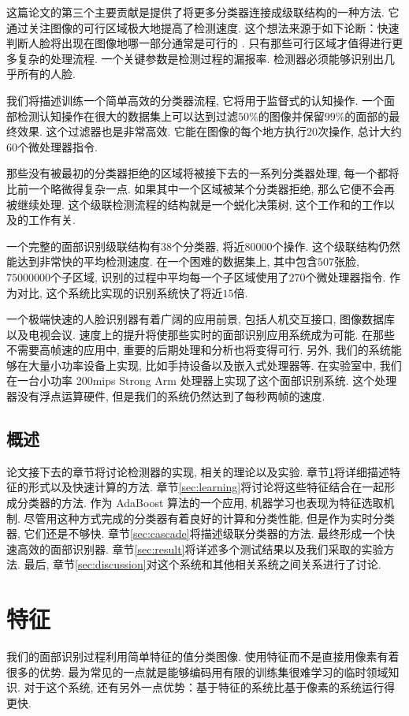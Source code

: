 \documentclass[a4paper,utf8,11pt, onecolumn]{ctexart}
\begin{document}
这篇论文的第三个主要贡献是提供了将更多分类器连接成级联结构的一种方法. 它通过关注图像的可行区域极大地提高了检测速度. 这个想法来源于如下论断：快速判断人脸将出现在图像地哪一部分通常是可行的
\citep{tsotsos1995modeling,itti1998model,amit1999computational,fleuret2001coarse}. 
只有那些可行区域才值得进行更多复杂的处理流程. 一个关键参数是检测过程的漏报率. 检测器必须能够识别出几乎所有的人脸. 

我们将描述训练一个简单高效的分类器流程, 它将用于监督式的认知操作. 一个面部检测认知操作在很大的数据集上可以达到过滤$50\%$的图像并保留$99\%$的面部的最终效果. 
这个过滤器也是非常高效. 它能在图像的每个地方执行$20$次操作, 总计大约$60$个微处理器指令. 

那些没有被最初的分类器拒绝的区域将被接下去的一系列分类器处理, 每一个都将比前一个略微得复杂一点. 如果其中一个区域被某个分类器拒绝, 那么它便不会再被继续处理. 这个级联检测流程的结构就是一个蜕化决策树, 这个工作和\citet{fleuret2001coarse}的工作以及\citet{amit1999computational}的工作有关. 

一个完整的面部识别级联结构有$38$个分类器, 将近$80000$个操作. 这个级联结构仍然能达到非常快的平均检测速度. 在一个困难的数据集上, 其中包含$507$张脸, $75000000$个子区域, 识别的过程中平均每一个子区域使用了$270$个微处理器指令. 作为对比, 这个系统比\citet{rowley1998neural}实现的识别系统快了将近$15$倍. 

一个极端快速的人脸识别器有着广阔的应用前景, 包括人机交互接口, 图像数据库以及电视会议. 速度上的提升将使那些实时的面部识别应用系统成为可能. 在那些不需要高帧速的应用中, 重要的后期处理和分析也将变得可行. 
另外, 我们的系统能够在大量小功率设备上实现, 比如手持设备以及嵌入式处理器等. 在实验室中, 我们在一台小功率 200mips Strong Arm 处理器上实现了这个面部识别系统. 这个处理器没有浮点运算硬件, 但是我们的系统仍然达到了每秒两帧的速度. 
\subsection{概述}
论文接下去的章节将讨论检测器的实现, 相关的理论以及实验. 
章节\ref{sec:feature}将详细描述特征的形式以及快速计算的方法. 章节\ref{sec:learning}将讨论将这些特征结合在一起形成分类器的方法. 作为 AdaBoost 算法的一个应用, 机器学习也表现为特征选取机制. 尽管用这种方式完成的分类器有着良好的计算和分类性能, 但是作为实时分类器, 它们还是不够快. 
章节\ref{sec:cascade}将描述级联分类器的方法. 最终形成一个快速高效的面部识别器. 章节\ref{sec:result}将详述多个测试结果以及我们采取的实验方法. 最后, 章节\ref{sec:discussion}对这个系统和其他相关系统之间关系进行了讨论. 
\section{特征}\label{sec:feature}
我们的面部识别过程利用简单特征的值分类图像. 使用特征而不是直接用像素有着很多的优势. 最为常见的一点就是能够编码用有限的训练集很难学习的临时领域知识. 对于这个系统, 还有另外一点优势：基于特征的系统比基于像素的系统运行得更快. 
\end{document}

